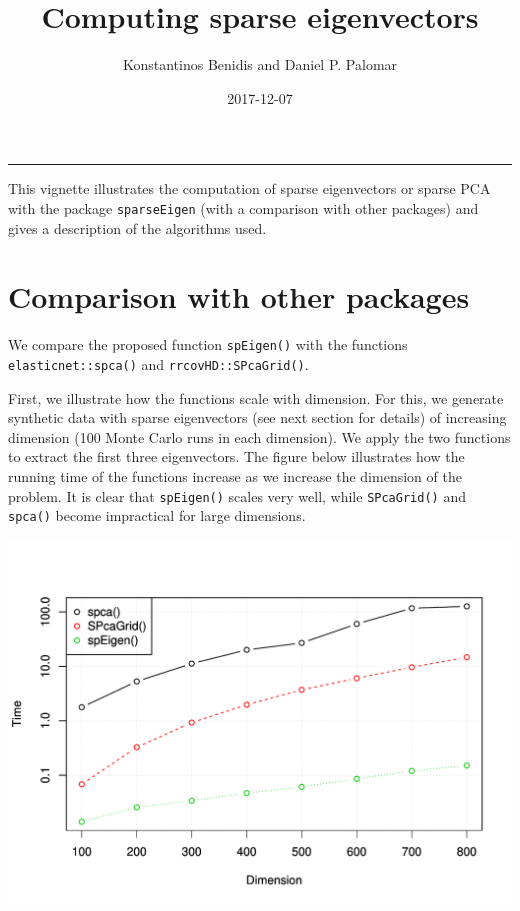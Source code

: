 \documentclass[]{article}
\title{Computing sparse eigenvectors}
\author{Konstantinos Benidis and Daniel P. Palomar}
\date{2017-12-07}
\begin{document}
\maketitle

{
\setcounter{tocdepth}{2}
\tableofcontents
}
\begin{center}\rule{0.5\linewidth}{\linethickness}\end{center}

This vignette illustrates the computation of sparse eigenvectors or
sparse PCA with the package \texttt{sparseEigen} (with a comparison with
other packages) and gives a description of the algorithms used.

\section{Comparison with other
packages}\label{comparison-with-other-packages}

We compare the proposed function \texttt{spEigen()} with the functions
\texttt{elasticnet::spca()} and \texttt{rrcovHD::SPcaGrid()}.

First, we illustrate how the functions scale with dimension. For this,
we generate synthetic data with sparse eigenvectors (see next section
for details) of increasing dimension (100 Monte Carlo runs in each
dimension). We apply the two functions to extract the first three
eigenvectors. The figure below illustrates how the running time of the
functions increase as we increase the dimension of the problem. It is
clear that \texttt{spEigen()} scales very well, while
\texttt{SPcaGrid()} and \texttt{spca()} become impractical for large
dimensions.

\begin{center}\includegraphics[width=0.75\linewidth]{figures/running_time} \end{center}
\end{document}
